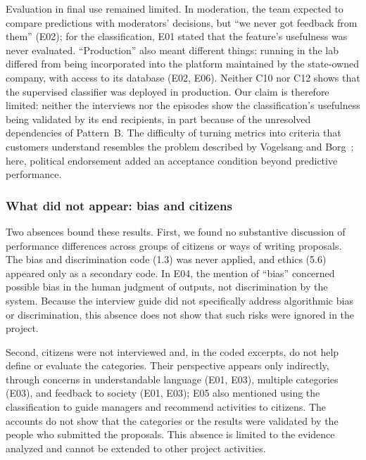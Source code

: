\documentclass[sigconf,nonacm]{acmart}
\begin{document}
Evaluation in final use remained limited. In moderation, the team expected to compare predictions with moderators' decisions, but ``we never got feedback from them'' (E02); for the classification, E01 stated that the feature's usefulness was never evaluated. ``Production'' also meant different things: running in the lab differed from being incorporated into the platform maintained by the state-owned company, with access to its database (E02, E06). Neither C10 nor C12 shows that the supervised classifier was deployed in production. Our claim is therefore limited: neither the interviews nor the episodes show the classification's usefulness being validated by its end recipients, in part because of the unresolved dependencies of Pattern~B. The difficulty of turning metrics into criteria that customers understand resembles the problem described by Vogelsang and Borg~\cite{vogelsang2019}; here, political endorsement added an acceptance condition beyond predictive performance.


\subsubsection{What did not appear: bias and citizens}
\label{sec:ausencias}

Two absences bound these results. First, we found no substantive discussion of performance differences across groups of citizens or ways of writing proposals. The bias and discrimination code (1.3) was never applied, and ethics (5.6) appeared only as a secondary code. In E04, the mention of ``bias'' concerned possible bias in the human judgment of outputs, not discrimination by the system. Because the interview guide did not specifically address algorithmic bias or discrimination, this absence does not show that such risks were ignored in the project.

Second, citizens were not interviewed and, in the coded excerpts, do not help define or evaluate the categories. Their perspective appears only indirectly, through concerns in understandable language (E01, E03), multiple categories (E03), and feedback to society (E01, E03); E05 also mentioned using the classification to guide managers and recommend activities to citizens. The accounts do not show that the categories or the results were validated by the people who submitted the proposals. This absence is limited to the evidence analyzed and cannot be extended to other project activities.
\end{document}
